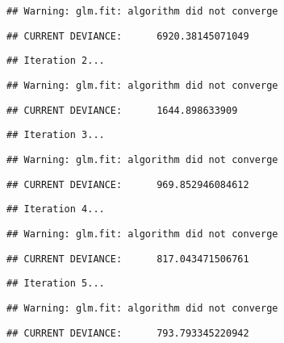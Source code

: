 \documentclass[
]{book}
\begin{document}
\begin{verbatim}
## Warning: glm.fit: algorithm did not converge
\end{verbatim}

\begin{verbatim}
## CURRENT DEVIANCE:      6920.38145071049
\end{verbatim}

\begin{verbatim}
## Iteration 2...
\end{verbatim}

\begin{verbatim}
## Warning: glm.fit: algorithm did not converge
\end{verbatim}

\begin{verbatim}
## CURRENT DEVIANCE:      1644.898633909
\end{verbatim}

\begin{verbatim}
## Iteration 3...
\end{verbatim}

\begin{verbatim}
## Warning: glm.fit: algorithm did not converge
\end{verbatim}

\begin{verbatim}
## CURRENT DEVIANCE:      969.852946084612
\end{verbatim}

\begin{verbatim}
## Iteration 4...
\end{verbatim}

\begin{verbatim}
## Warning: glm.fit: algorithm did not converge
\end{verbatim}

\begin{verbatim}
## CURRENT DEVIANCE:      817.043471506761
\end{verbatim}

\begin{verbatim}
## Iteration 5...
\end{verbatim}

\begin{verbatim}
## Warning: glm.fit: algorithm did not converge
\end{verbatim}

\begin{verbatim}
## CURRENT DEVIANCE:      793.793345220942
\end{verbatim}
\end{document}
